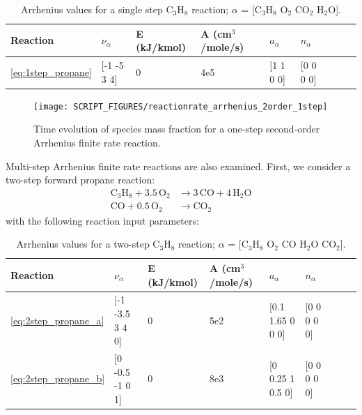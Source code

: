 \documentclass[11pt]{book}
\begin{document}
\begin{table}[ht]
\begin{center}
\caption[Arrhenius values for a single step C$_3$H$_8$ reaction]{Arrhenius values for a single step C$_3$H$_8$ reaction; $\alpha$ = [$\mathrm{C_3H_8}$ $\mathrm{O_2}$ $\mathrm{CO_2}$ $\mathrm{H_2O}$].}
\label{single_step_c3h8}
\begin{tabular}{|l|l|l|l|l|l|l|l|l|}
\hline Reaction & $\nu_{\alpha}$ & E (kJ/kmol) & A (cm$^3$/mole/s) & $a_{\alpha}$ & $n_{\alpha}$  \\ \hline \hline
\ref{eq:1step_propane} & [-1 -5 3 4] & 0 & 4e5 & [1 1 0 0] & [0 0 0 0] \\ \hline
\end{tabular}
\end{center}
\end{table}
\begin{figure}[h!]
\centering
\texttt{[image: SCRIPT\_FIGURES/reactionrate\_arrhenius\_2order\_1step]}
\caption[Species evolution in a 2-order 1-step finite rate reaction]{Time evolution of species mass fraction for a one-step second-order Arrhenius finite rate reaction.}
\label{fig:Arrhenius_2Order_1step}
\end{figure}
Multi-step Arrhenius finite rate reactions are also examined. First, we consider a two-step forward propane reaction:
\begin{subequations}
\begin{align}
\label{eq:2step_propane_a}
\mathrm{C_3H_8+3.5 \, O_2} &\rightarrow  \mathrm{3 \, CO + 4 \, H_2O} \\
\label{eq:2step_propane_b}
\mathrm{CO+0.5 \, O_2} &\rightarrow \mathrm{CO_2}
\end{align}
\end{subequations}
with the following reaction input parameters:

\begin{table}[ht]
\begin{center}
\caption[Arrhenius values for a two-step C$_3$H$_8$ reaction]{Arrhenius values for a two-step C$_3$H$_8$ reaction; $\alpha$ = [$\mathrm{C_3H_8}$ $\mathrm{O_2}$ $\mathrm{CO}$ $\mathrm{H_2O}$ $\mathrm{CO_2}$].}
\label{two_step_c3h8}
\begin{tabular}{|l|l|l|l|l|l|l|l|l|}
\hline Reaction & $\nu_{\alpha}$ & E (kJ/kmol) & A (cm$^3$/mole/s) & $a_{\alpha}$ & $n_{\alpha}$  \\ \hline \hline
\ref{eq:2step_propane_a} & [-1 -3.5 3 4 0] & 0 & 5e2 & [0.1 1.65 0 0 0] & [0 0 0 0 0] \\ \hline
\ref{eq:2step_propane_b} & [0 -0.5 -1 0 1] & 0 & 8e3 & [0 0.25 1 0.5 0] & [0 0 0 0 0] \\ \hline
\end{tabular}
\end{center}
\end{table}
\end{document}
